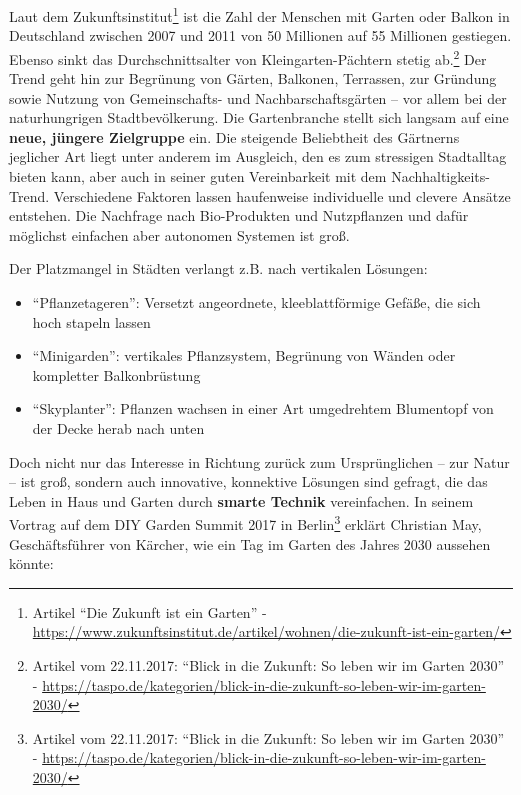 Laut dem Zukunftsinstitut\footnote{Artikel ``Die Zukunft ist ein
  Garten'' -
  \url{https://www.zukunftsinstitut.de/artikel/wohnen/die-zukunft-ist-ein-garten/}}
ist die Zahl der Menschen mit Garten oder Balkon in Deutschland zwischen
2007 und 2011 von 50 Millionen auf 55 Millionen gestiegen. Ebenso sinkt
das Durchschnittsalter von Kleingarten-Pächtern stetig ab.\footnote{Artikel
  vom 22.11.2017: ``Blick in die Zukunft: So leben wir im Garten 2030''
  -
  \url{https://taspo.de/kategorien/blick-in-die-zukunft-so-leben-wir-im-garten-2030/}}
Der Trend geht hin zur Begrünung von Gärten, Balkonen, Terrassen, zur
Gründung sowie Nutzung von Gemeinschafts- und Nachbarschaftsgärten --
vor allem bei der naturhungrigen Stadtbevölkerung. Die Gartenbranche
stellt sich langsam auf eine \textbf{neue, jüngere Zielgruppe} ein. Die
steigende Beliebtheit des Gärtnerns jeglicher Art liegt unter anderem im
Ausgleich, den es zum stressigen Stadtalltag bieten kann, aber auch in
seiner guten Vereinbarkeit mit dem Nachhaltigkeits-Trend. Verschiedene
Faktoren lassen haufenweise individuelle und clevere Ansätze entstehen.
Die Nachfrage nach Bio-Produkten und Nutzpflanzen und dafür möglichst
einfachen aber autonomen Systemen ist groß.

Der Platzmangel in Städten verlangt z.B. nach vertikalen Lösungen:

\begin{itemize}
\tightlist
\item
  ``Pflanzetageren'': Versetzt angeordnete, kleeblattförmige Gefäße, die
  sich hoch stapeln lassen
\item
  ``Minigarden'': vertikales Pflanzsystem, Begrünung von Wänden oder
  kompletter Balkonbrüstung
\item
  ``Skyplanter'': Pflanzen wachsen in einer Art umgedrehtem Blumentopf
  von der Decke herab nach unten
\end{itemize}

Doch nicht nur das Interesse in Richtung zurück zum Ursprünglichen --
zur Natur -- ist groß, sondern auch innovative, konnektive Lösungen sind
gefragt, die das Leben in Haus und Garten durch \textbf{smarte Technik}
vereinfachen. In seinem Vortrag auf dem DIY Garden Summit 2017 in
Berlin\footnote{Artikel vom 22.11.2017: ``Blick in die Zukunft: So leben
  wir im Garten 2030'' -
  \url{https://taspo.de/kategorien/blick-in-die-zukunft-so-leben-wir-im-garten-2030/}}
erklärt Christian May, Geschäftsführer von Kärcher, wie ein Tag im
Garten des Jahres 2030 aussehen könnte:

